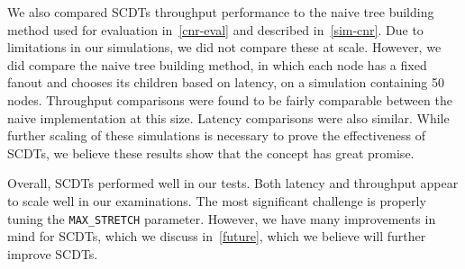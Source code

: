 We also compared SCDTs throughput performance to the naive tree building method used for evaluation in~\autoref{cnr-eval} and described in~\autoref{sim-cnr}. Due to limitations in our simulations, we did not compare these at scale. However, we did compare the naive tree building method, in which each node has a fixed fanout and chooses its children based on latency, on a simulation containing 50 nodes. Throughput comparisons were found to be fairly comparable between the naive implementation at this size.  Latency comparisons were also similar.  While further scaling of these simulations is necessary to prove the effectiveness of SCDTs, we believe these results show that the concept has great promise.

Overall, SCDTs performed well in our tests. Both latency and throughput appear to scale well in our examinations. The most significant challenge is properly tuning the \texttt{MAX\_STRETCH} parameter. However, we have many improvements in mind for SCDTs, which we discuss in~\autoref{future}, which we believe will further improve SCDTs. 